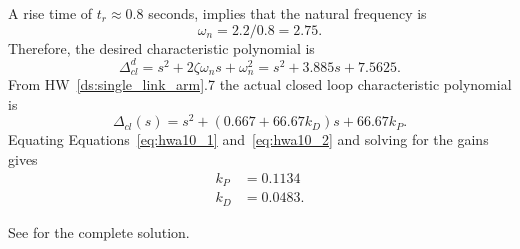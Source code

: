 A rise time of $t_r\approx 0.8$ seconds, implies that the natural frequency is
\[
\omega_n = 2.2/0.8 = 2.75.
\]
Therefore, the desired characteristic polynomial is
\begin{equation}\label{eq:hwa10_1}
\Delta_{cl}^d = s^2 + 2\zeta\omega_n s + \omega_n^2 = s^2 + 3.885 s + 7.5625.
\end{equation}
From HW~\ref{ds:single_link_arm}.7 the actual closed loop characteristic polynomial is
\begin{equation}\label{eq:hwa10_2}
\Delta_{cl}(s) = s^2 + (0.667 + 66.67k_D)s + 66.67k_P.
\end{equation}
Equating Equations~\eqref{eq:hwa10_1} and~\eqref{eq:hwa10_2} and solving for the gains gives
\begin{align*}
k_P &=  0.1134 \\
k_D &= 0.0483.
\end{align*}

See  for the complete solution.
